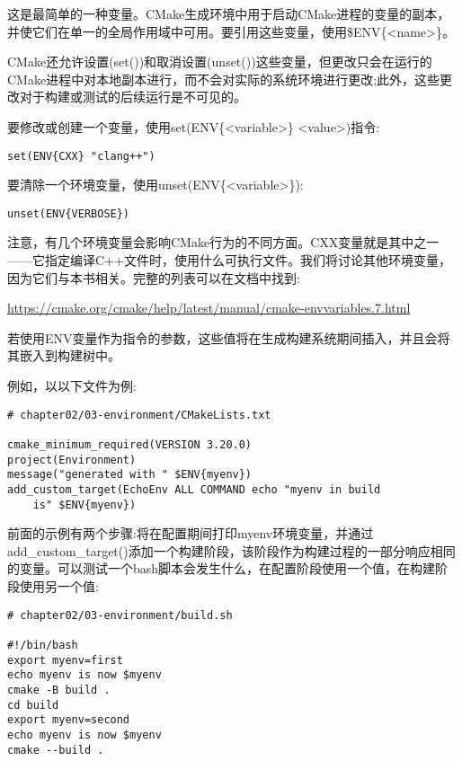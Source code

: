 
这是最简单的一种变量。CMake生成环境中用于启动CMake进程的变量的副本，并使它们在单一的全局作用域中可用。要引用这些变量，使用\$ENV\{<name>\}。

CMake还允许设置(set())和取消设置(unset())这些变量，但更改只会在运行的CMake进程中对本地副本进行，而不会对实际的系统环境进行更改;此外，这些更改对于构建或测试的后续运行是不可见的。

要修改或创建一个变量，使用set(ENV\{<variable>\} <value>)指令:

\begin{lstlisting}[style=styleCMake]
set(ENV{CXX} "clang++")
\end{lstlisting}

要清除一个环境变量，使用unset(ENV\{<variable>\}):

\begin{lstlisting}[style=styleCMake]
unset(ENV{VERBOSE})
\end{lstlisting}

注意，有几个环境变量会影响CMake行为的不同方面。CXX变量就是其中之一——它指定编译C++文件时，使用什么可执行文件。我们将讨论其他环境变量，因为它们与本书相关。完整的列表可以在文档中找到:

\url{https://cmake.org/cmake/help/latest/manual/cmake-envvariables.7.html}

若使用ENV变量作为指令的参数，这些值将在生成构建系统期间插入，并且会将其嵌入到构建树中。

例如，以以下文件为例:

\begin{lstlisting}[style=styleCMake]
# chapter02/03-environment/CMakeLists.txt

cmake_minimum_required(VERSION 3.20.0)
project(Environment)
message("generated with " $ENV{myenv})
add_custom_target(EchoEnv ALL COMMAND echo "myenv in build
	is" $ENV{myenv})
\end{lstlisting}

前面的示例有两个步骤:将在配置期间打印myenv环境变量，并通过add\_custom\_target()添加一个构建阶段，该阶段作为构建过程的一部分响应相同的变量。可以测试一个bash脚本会发生什么，在配置阶段使用一个值，在构建阶段使用另一个值:

\begin{lstlisting}[style=stylePython]
# chapter02/03-environment/build.sh
	
#!/bin/bash
export myenv=first
echo myenv is now $myenv
cmake -B build .
cd build
export myenv=second
echo myenv is now $myenv
cmake --build .
\end{lstlisting}

